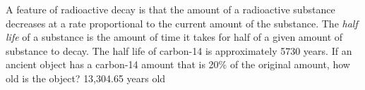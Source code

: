 {
A feature of radioactive decay is that the amount of a radioactive substance decreases at a rate proportional to the current amount of the substance.  The \emph{half life}  of a substance is the amount of time it takes for half of a given amount of substance to decay.  The half life of carbon-14 is approximately 5730 years.  If an ancient object has a carbon-14 amount that is 20\% of the original amount, how old is the object?
}
{
13,304.65 years old
}
